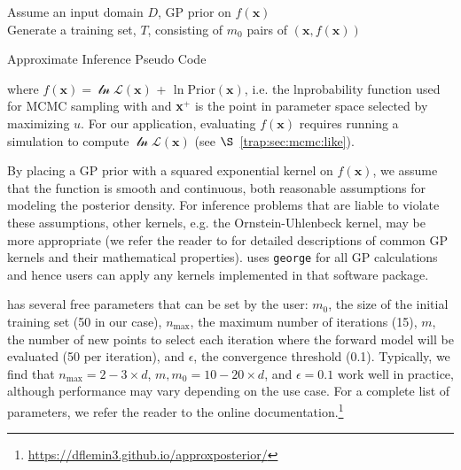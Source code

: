 \begin{algorithm} 
\SetAlgoLined
 Assume an input domain $D$, GP prior on $f(\textbf{x})$ \\
 Generate a training set, $T$, consisting of $m_0$ pairs of $(\textbf{x}, f(\textbf{x}))$ \\
\caption{\approxposterior Approximate Inference Pseudo Code  \label{AP:app:algo}}
\end{algorithm}
where $f(\textbf{x}) = \mathcal{\ln L}(\textbf{x})$ + $\ln \mathrm{Prior}(\textbf{x})$, i.e. the lnprobability function used for MCMC sampling with \emcee and \textbf{x}$^+$ is the point in parameter space selected by maximizing $u$. For our application, evaluating $f(\textbf{x})$ requires running a \vplanet simulation to compute $\mathcal{\ln L}(\textbf{x})$ (see $\S$~\ref{trap:sec:mcmc:like}).

By placing a GP prior with a squared exponential kernel on $f(\textbf{x})$, we assume that the function is smooth and continuous, both reasonable assumptions for modeling the posterior density. For inference problems that are liable to violate these assumptions, other kernels, e.g. the Ornstein-Uhlenbeck kernel, may be more appropriate (we refer the reader to \citet{Rasmussen2006} for detailed descriptions of common GP kernels and their mathematical properties). \approxposterior uses \texttt{george} \citep{george} for all GP calculations and hence users can apply any kernels implemented in that software package.

\approxposterior has several free parameters that can be set by the user: $m_0$, the size of the initial training set (50 in our case), $n_{\mathrm{max}}$, the maximum number of iterations (15), $m$, the number of new points to select each iteration where the forward model will be evaluated (50 per iteration), and $\epsilon$, the convergence threshold (0.1). Typically, we find that $n_{\mathrm{max}}=2-3 \times d$, $m, m_0 = 10-20 \times d$, and $\epsilon = 0.1$ work well in practice, although performance may vary depending on the use case. For a complete list of \approxposterior parameters, we refer the reader to the online documentation.\footnote{ \href{https://dflemin3.github.io/approxposterior}{https://dflemin3.github.io/approxposterior/}}

